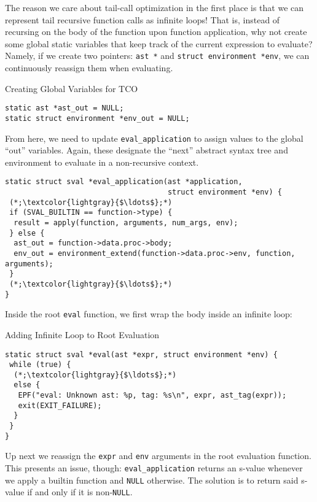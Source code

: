 The reason we care about tail-call optimization in the first place is that we can represent tail recursive function calls as infinite loops! That is, instead of recursing on the body of the function upon function application, why not create some global static variables that keep track of the current expression to evaluate? Namely, if we create two pointers: \texttt{ast *} and \texttt{struct environment *env}, we can continuously reassign them when evaluating.

\begin{cl}[eval.c]{Creating Global Variables for TCO}\begin{lstlisting}[language=MyC]
static ast *ast_out = NULL;
static struct environment *env_out = NULL;
\end{lstlisting}\end{cl}

From here, we need to update \texttt{eval\_application} to assign values to the global ``out'' variables. Again, these designate the ``next'' abstract syntax tree and environment to evaluate in a non-recursive context.

\begin{cl}[eval.c]{}\begin{lstlisting}[language=MyC]
static struct sval *eval_application(ast *application, 
                                     struct environment *env) {
 (*;\textcolor{lightgray}{$\ldots$};*)
 if (SVAL_BUILTIN == function->type) {
  result = apply(function, arguments, num_args, env);
 } else {
  ast_out = function->data.proc->body;
  env_out = environment_extend(function->data.proc->env, function, arguments);
 }
 (*;\textcolor{lightgray}{$\ldots$};*)
}
\end{lstlisting}\end{cl}

Inside the root \texttt{eval} function, we first wrap the body inside an infinite loop:

\begin{cl}[eval.c]{Adding Infinite Loop to Root Evaluation}\begin{lstlisting}[language=MyC]
static struct sval *eval(ast *expr, struct environment *env) {
 while (true) {
  (*;\textcolor{lightgray}{$\ldots$};*)
  else {
   EPF("eval: Unknown ast: %p, tag: %s\n", expr, ast_tag(expr));
   exit(EXIT_FAILURE);
  }
 }
}
\end{lstlisting}\end{cl}

Up next we reassign the \texttt{expr} and \texttt{env} arguments in the root evaluation function. This presents an issue, though: \texttt{eval\_application} returns an s-value whenever we apply a builtin function and \texttt{NULL} otherwise. The solution is to return said s-value if and only if it is non-\texttt{NULL}.

